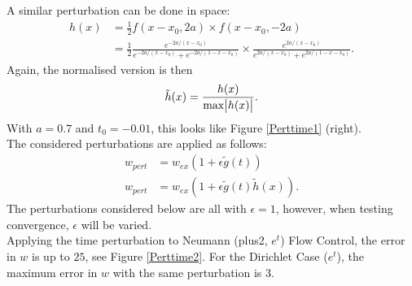 \documentclass[11pt, a4paper]{article}
\theoremstyle{definition}
\begin{document}
A similar perturbation can be done in space:
\begin{align*}
h(x) &= \frac{1}{2} f(x-x_0, 2a) \times f(x-x_0, -2a)\\
&= \frac{1}{2} \frac{e^{-2a/(x-x_0)}}{e^{-2a/(x-x_0)} + e^{-2a/(1-x-x_0)}} \times \frac{e^{2a/(x-x_0)}}{e^{2a/(x-x_0)} + e^{2a/(1-x-x_0)}}.
\end{align*}
Again, the normalised version is then 
\begin{align*}
\tilde h(x) = \frac{h(x)}{\max{\abs{h(x)}}}.
\end{align*}
With $a = 0.7$ and $t_0 = -0.01$, this looks like Figure \ref{Perttime1} (right).
\\
The considered perturbations are applied as follows:
\begin{align*}
w_{pert} &= w_{ex}(1+ \epsilon \tilde g(t))\\
w_{pert} &= w_{ex}(1+ \epsilon \tilde g(t) \tilde h(x)).
\end{align*}
The perturbations considered below are all with $\epsilon = 1$, however, when testing convergence, $\epsilon$ will be varied.\\
Applying the time perturbation to Neumann (plus2, $e^t$) Flow Control, the error in $w$ is up to $25$, see Figure \ref{Perttime2}. For the Dirichlet Case ($e^t$), the maximum error in $w$ with the same perturbation is $3$.
\end{document}

